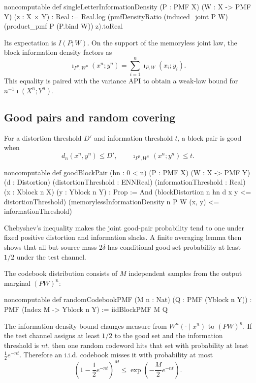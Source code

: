 \documentclass[11pt]{article}
\begin{document}
\begin{LeanCode}
noncomputable def singleLetterInformationDensity
    (P : PMF X) (W : X -> PMF Y) (z : X × Y) : Real :=
  Real.log (pmfDensityRatio (induced_joint P W)
    (product_pmf P (P.bind W)) z).toReal
\end{LeanCode}

Its expectation is $I(P;W)$.  On the support of the memoryless joint law, the
block information density factors as
\[
  \imath_{P^n,W^n}(x^n;y^n)=\sum_{i=1}^n\imath_{P,W}(x_i;y_i).
\]
This equality is paired with the variance API to obtain a weak-law bound for
$n^{-1}\imath(X^n;Y^n)$.

\subsection{Good pairs and random covering}

For a distortion threshold $D'$ and information threshold $t$, a block pair is
good when
\[
  d_n(x^n,y^n)\le D',\qquad
  \imath_{P^n,W^n}(x^n;y^n)\le t.
\]

\begin{LeanCode}
noncomputable def goodBlockPair
    (hn : 0 < n) (P : PMF X) (W : X -> PMF Y)
    (d : Distortion) (distortionThreshold : ENNReal)
    (informationThreshold : Real)
    (x : Xblock n X) (y : Yblock n Y) : Prop :=
  And (blockDistortion n hn d x y <= distortionThreshold)
    (memorylessInformationDensity n P W (x, y) <= informationThreshold)
\end{LeanCode}

Chebyshev's inequality makes the joint good-pair probability tend to one under
fixed positive distortion and information slacks.  A finite averaging lemma
then shows that all but source mass $2\delta$ has conditional good-set
probability at least $1/2$ under the test channel.

The codebook distribution consists of $M$ independent samples from the output
marginal $(PW)^n$:
\begin{LeanCode}
noncomputable def randomCodebookPMF
    (M n : Nat) (Q : PMF (Yblock n Y)) :
    PMF (Index M -> Yblock n Y) :=
  iidBlockPMF M Q
\end{LeanCode}

The information-density bound changes measure from $W^n(\cdot\mid x^n)$ to
$(PW)^n$.  If the test channel assigns at least $1/2$ to the good set and the
information threshold is $nt$, then one random codeword hits that set with
probability at least $\tfrac12e^{-nt}$.  Therefore an i.i.d. codebook misses it
with probability at most
\[
  \left(1-\frac12e^{-nt}\right)^M
  \le \exp\!\left(-\frac{M}{2}e^{-nt}\right).
\]
\end{document}
